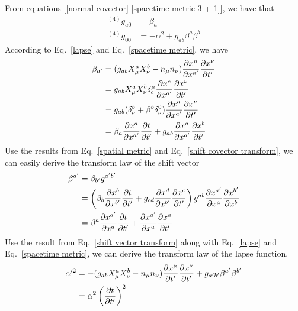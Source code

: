\documentclass[letterpaper,nofootinbib,prd,amsmath,onecolumn]{revtex4-1}
\begin{document}
From equations [\ref{normal covector}-\ref{spacetime metric 3 + 1}], we have that
\begin{align}
^{(4)}g_{a0} & = \beta_{a}\label{lapse}\\
^{(4)}g_{00} & = -\alpha^2 + g_{ab}\beta^{a}\beta^{b}\label{shift}
\end{align}
According to Eq.~\ref{lapse} and Eq.~\ref{spacetime metric}, we have
\begin{align}
\beta_{a'} & = (g_{ab}X^{a}_{\mu}X^{b}_{\nu} - n_{\mu}n_{\nu})\frac{\partial x^{\mu}}{\partial x^{a'}}\frac{\partial x^{\nu}}{\partial t'}\notag\\
& = g_{ab}X^{a}_{\mu}X^{b}_{\nu}\delta_{c}^{\mu}\frac{\partial x^{c}}{\partial x^{a'}}\frac{\partial x^{\nu}}{\partial t'}\notag\\
& = g_{ab}(\delta^{b}_{\nu} + \beta^{b}\delta^{0}_{\nu})\frac{\partial x^{a}}{\partial x^{a'}}\frac{\partial x^{\nu}}{\partial t'}\notag\\
& = \beta_{a}\frac{\partial x^{a}}{\partial x^{a'}}\frac{\partial t}{\partial t'} + g_{ab}\frac{\partial x^{a}}{\partial x^{a'}}\frac{\partial x^{b}}{\partial t'}\label{shift covector transform}
\end{align}
Use the results from Eq.~\ref{spatial metric} and Eq.~\ref{shift covector transform}, we can easily derive the transform law of the shift vector
\begin{align}
\beta^{a'} & = \beta_{b'}g^{a'b'}\notag\\
& = \left(\beta_{b}\frac{\partial x^{b}}{\partial x^{b'}}\frac{\partial t}{\partial t'} + g_{cd}\frac{\partial x^{d}}{\partial x^{b'}}\frac{\partial x^{c}}{\partial t'}\right)g^{ab}\frac{\partial x^{a'}}{\partial x^{a}}\frac{\partial x^{b'}}{\partial x^{b}}\notag\\
& = \beta^{a}\frac{\partial x^{a'}}{\partial x^{a}}\frac{\partial t}{\partial t'} + \frac{\partial x^{a'}}{\partial x^{a}}\frac{\partial x^{a}}{\partial t'}\label{shift vector transform}
\end{align}
Use the result from Eq.~\ref{shift vector transform} along with Eq.~\ref{lapse} and Eq.~\ref{spacetime metric}, we can derive the transform law of the lapse function. 
\begin{align*}
\alpha'^{2} & = - (g_{ab}X^{a}_{\mu}X^{b}_{\nu} - n_{\mu}n_{\nu})\frac{\partial x^{\mu}}{\partial t'}\frac{\partial x^{\nu}}{\partial t'} + g_{a'b'}\beta^{a'}\beta^{b'}\notag\\ 
& = \alpha^2\left(\frac{\partial t}{\partial t'}\right)^{2}
\end{align*}
\end{document}
